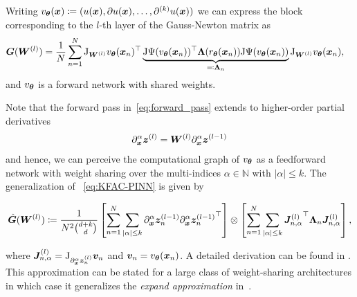 Writing $v_\vtheta(\vx)\coloneqq (%
u(\vx), \partial u(\vx), \dots, \partial^{(k)} u(\vx))$
we can express the block corresponding to the $l$-th layer of the Gauss-Newton matrix as
\begin{align}
    {\bm{G}}({\bm{W}}^{(l)}) & = \frac1N\sum_{n=1}^N \mathrm{J}_{{\bm{W}}^{(l)}} v_{\bm{\theta}}({\bm{x}}_n)^\top \underbrace{\mathrm{J} \Psi(v_{\bm{\theta}}({\bm{x}}_n))^\top {\bm{\Lambda}}(r_{\bm{\theta}}({\bm{x}}_n)) \mathrm{J} \Psi(v_{\bm{\theta}}({\bm{x}}_n))}_{\eqqcolon {\bm{\Lambda}}_n}  \mathrm{J}_{{\bm{W}}^{(l)}} v_{\bm{\theta}}({\bm{x}}_n),
\end{align}
and $v_{\bm{\theta}}$ is a forward network with shared weights.

Note that the forward pass in~\eqref{eq:forward_pass} extends to higher-order partial derivatives
\begin{align}
    \partial_{\bm{x}}^\alpha {\bm{z}}^{(l)} = {\bm{W}}^{(l)}\partial_{\bm{x}}^\alpha {\bm{z}}^{(l-1)}
\end{align}
and hence, we can perceive the computational graph of $v_{\bm{\theta}}$ as a feedforward network with weight sharing over the multi-indices $\alpha\in\mathbb N$ with $\lvert \alpha \rvert \le k$.
The generalization of%
~\eqref{eq:KFAC-PINN} is given by
\begin{tcolorbox}[colframe=kfac, title={KFAC with general PDE terms},bottom=0mm,top=0mm,middle=0mm]
\begin{align}\label{eq:KFAC-PINNs-general}
    \hat{\mG}%
    (\mW^{(l)})
    \coloneqq \frac{1}{N^2\binom{d+k}{d}}
    \left[\sum_{n=1}^N \sum_{\lvert \alpha \rvert \le k} %
    \partial_\vx^\alpha \vz_n^{(l-1)} {\partial_\vx^\alpha \vz_n^{(l-1)}}^\top\right]
    \otimes
    \left[\sum_{n=1}^N\sum_{\lvert \alpha \rvert \le k} {\mJ^{(l)}_{n,\alpha}}^\top \mLambda_n \mJ^{(l)}_{n,\alpha} \right],
\end{align}
\end{tcolorbox}
where $\mJ^{(l)}_{n,\alpha} = %
\jac_{\partial_\vx^\alpha \vz_n^{(l)}} \vv_n$ and $\vv_n = v_\vtheta(\vx_n) %
$.
A detailed derivation can be found in .
%
This approximation can be stated for a large class of weight-sharing architectures in which case it generalizes the \emph{expand approximation} in~\citet{eschenhagen2023kroneckerfactored}.

